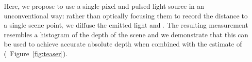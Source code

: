

Here, we propose to use a single-pixel  and pulsed light source in an
unconventional way: rather than optically focusing them to record the distance
to a single scene point, we diffuse the emitted light and . The resulting  measurement resembles a histogram of the depth of
the scene and we demonstrate that this can be used to achieve accurate absolute
depth when combined with the estimate of  (\cf~Figure~\ref{fig:teaser}).






